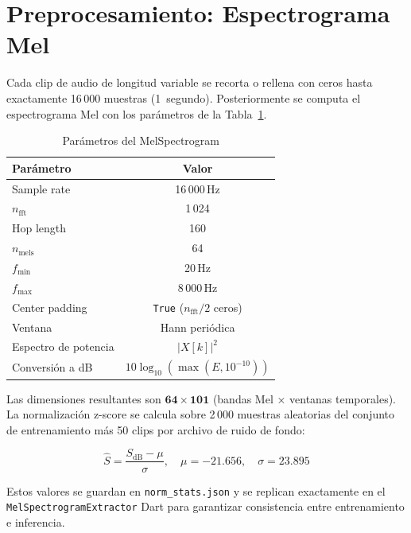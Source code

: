 \documentclass[conference]{IEEEtran}
\begin{document}
\section{Preprocesamiento: Espectrograma Mel}

Cada clip de audio de longitud variable se recorta o rellena con ceros hasta
exactamente 16\,000 muestras (1~segundo).  Posteriormente se computa el
espectrograma Mel con los parámetros de la Tabla~\ref{tab:melparams}.

\begin{table}[htbp]
\caption{Parámetros del MelSpectrogram}
\label{tab:melparams}
\centering
\begin{tabular}{lc}
\toprule
\textbf{Parámetro} & \textbf{Valor} \\
\midrule
Sample rate          & 16\,000\,Hz \\
$n_\text{fft}$       & 1\,024 \\
Hop length           & 160 \\
$n_\text{mels}$      & 64 \\
$f_\text{min}$       & 20\,Hz \\
$f_\text{max}$       & 8\,000\,Hz \\
Center padding       & \texttt{True} ($n_\text{fft}/2$ ceros) \\
Ventana              & Hann periódica \\
Espectro de potencia & $|X[k]|^2$ \\
Conversión a dB      & $10 \log_{10}(\max(E, 10^{-10}))$ \\
\bottomrule
\end{tabular}
\end{table}

Las dimensiones resultantes son \(\mathbf{64 \times 101}\) (bandas Mel ×
ventanas temporales).  La normalización z-score se calcula sobre 2\,000
muestras aleatorias del conjunto de entrenamiento más 50 clips por archivo de
ruido de fondo:

\begin{equation}
  \hat{S} = \frac{S_\text{dB} - \mu}{\sigma}, \quad
  \mu = -21.656, \quad \sigma = 23.895
\end{equation}

Estos valores se guardan en \texttt{norm\_stats.json} y se replican
exactamente en el \texttt{MelSpectrogramExtractor} Dart para garantizar
consistencia entre entrenamiento e inferencia.

\end{document}
